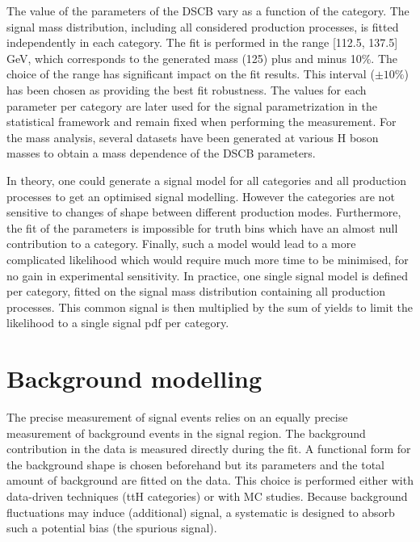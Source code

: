 The value of the parameters of the DSCB vary as a function of the category.
The signal mass distribution, including all considered production processes, is fitted independently in each category.
The fit is performed in the range [112.5, 137.5] GeV, which corresponds to the generated mass (125) plus and minus 10\%.
The choice of the range has significant impact on the fit results.
This interval ($\pm 10\%$) has been chosen as providing the best fit robustness.
The values for each parameter per category are later used for the signal parametrization in the statistical framework and remain fixed when performing the measurement.
For the mass analysis, several datasets have been generated at various H boson masses to obtain a mass dependence of the DSCB parameters.

In theory, one could generate a signal model for all categories and all production processes to get an optimised signal modelling.
However the categories are not sensitive to changes of shape between different production modes.
Furthermore, the fit of the parameters is impossible for truth bins which have an almost null contribution to a category.
Finally, such a model would lead to a more complicated likelihood which would require much more time to be minimised, for no gain in experimental sensitivity.
In practice, one single signal model is defined per category, fitted on the signal mass distribution containing all production processes.
This common signal is then multiplied by the sum of yields to limit the likelihood to a single signal pdf per category.

\section{Background modelling}
\label{sec:orgb6f3d36}
\label{sec:HGam_backgroundModelling}

The precise measurement of signal events relies on an equally precise measurement of background events in the signal region.
The background contribution in the data is measured directly during the fit.
A functional form for the background shape is chosen beforehand but its parameters and the total amount of background are fitted on the data.
This choice is performed either with data-driven techniques (ttH categories) or with MC studies.
Because background fluctuations may induce (additional) signal, a systematic is designed to absorb such a potential bias (the spurious signal).

